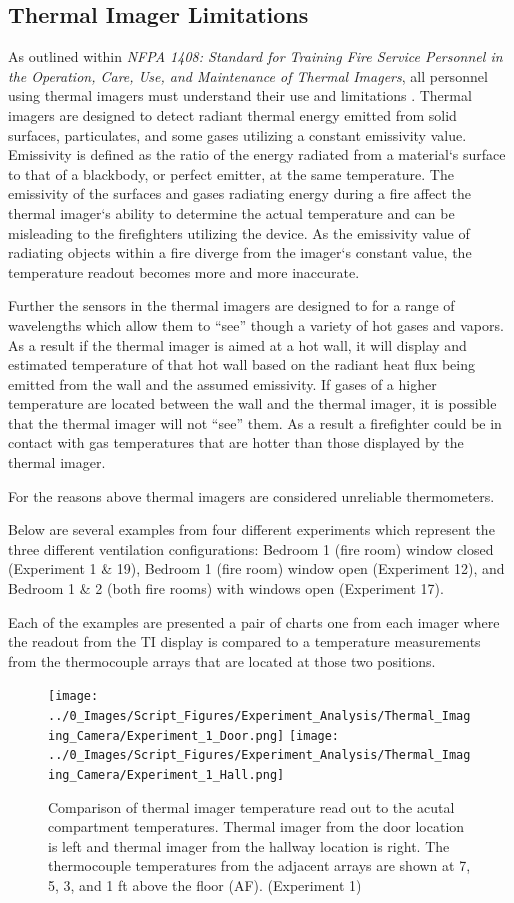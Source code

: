 \documentclass[12pt,oneside]{book}
\begin{document}
\subsection{Thermal Imager Limitations}
As outlined within \textit{NFPA 1408: Standard for Training Fire Service Personnel in the Operation, Care, Use, and Maintenance of Thermal Imagers}, all personnel using thermal imagers must understand their use and limitations \cite{NFPA1408}. Thermal imagers are designed to detect radiant thermal energy emitted from solid surfaces, particulates, and some gases utilizing a constant emissivity value. Emissivity is defined as the ratio of the energy radiated from a material`s surface to that of a blackbody, or perfect emitter, at the same temperature. The emissivity of the surfaces and gases radiating energy during a fire affect the thermal imager`s ability to determine the actual temperature and can be misleading to the firefighters utilizing the device. As the emissivity value of radiating objects within a fire diverge from the imager`s constant value, the temperature readout becomes more and more inaccurate.

Further the sensors in the thermal imagers are designed to for a range of wavelengths which allow them to ``see'' though a variety of hot gases and vapors. As a result if the thermal imager is aimed at a hot wall, it will display and estimated temperature of that hot wall based on the radiant heat flux being emitted from the wall and the assumed emissivity. If gases of a higher temperature are located between the wall and the thermal imager, it is possible that the thermal imager will not ``see'' them. As a result a firefighter could be in contact with gas temperatures that are hotter than those displayed by the thermal imager.  

For the reasons above thermal imagers are considered unreliable thermometers.

Below are several examples from four different experiments which represent the three different ventilation configurations: Bedroom 1 (fire room) window closed (Experiment 1 \& 19), Bedroom 1 (fire room) window open (Experiment 12), and Bedroom 1 \& 2 (both fire rooms) with windows open (Experiment 17).   

Each of the examples are presented a pair of charts one from each imager where the readout from the TI display is compared to a temperature measurements from the thermocouple arrays that are located at those two positions. 

\begin{figure}[H]
\centering
\texttt{[image: ../0\_Images/Script\_Figures/Experiment\_Analysis/Thermal\_Imaging\_Camera/Experiment\_1\_Door.png]}
\texttt{[image: ../0\_Images/Script\_Figures/Experiment\_Analysis/Thermal\_Imaging\_Camera/Experiment\_1\_Hall.png]}
\caption[Thermal Imager G]{Comparison of thermal imager temperature read out to the acutal compartment temperatures. Thermal imager from the door location is left and thermal imager from the hallway location is right. The thermocouple temperatures from the adjacent arrays are shown at 7, 5, 3, and 1 ft above the floor (AF). (Experiment 1)}
\label{fig:thermal_imager_g}
\end{figure}
\end{document}
